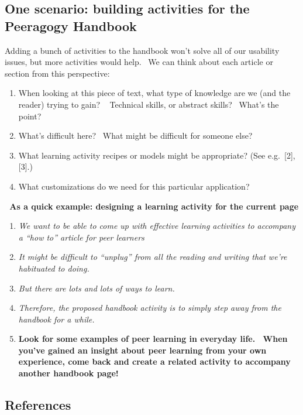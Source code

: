 \hypertarget{one-scenario-building-activities-for-the-peeragogy-handbook}{%
\subsection{One scenario: building activities for the Peeragogy
Handbook}\label{one-scenario-building-activities-for-the-peeragogy-handbook}}

Adding a bunch of activities to the handbook won't solve all of our
usability issues, but more activities would help.~ We can think about
each article or section from this perspective:

\begin{enumerate}
\def\labelenumi{\arabic{enumi}.}
\item
  When looking at this piece of text, what type of knowledge are we (and
  the reader) trying to gain? ~ Technical skills, or abstract skills?~
  What's the point?
\item
  What's difficult here? ~What might be difficult for someone else?
\item
  What learning activity recipes or models might be appropriate? (See
  e.g.~{{[}2{]}}, {{[}3{]}}.)
\item
  What customizations do we need for this particular application?
\end{enumerate}

\textbf{\emph{~}As a quick example: designing a learning activity for
the current page}

\begin{enumerate}
\def\labelenumi{\arabic{enumi}.}
\item
  \emph{We want to be able to come up with effective learning activities
  to accompany a ``how to'' article for peer learners}
\item
  \emph{It might be difficult to ``unplug'' from all the reading and
  writing that we're habituated to doing.}
\item
  \emph{But there are lots and lots of ways to learn.}
\item
  \emph{Therefore, the proposed handbook activity is to simply step away
  from the handbook for a while.}
\item
  \textbf{Look for some examples of peer learning in everyday life.~
  When you've gained an insight about peer learning from your own
  experience, come back and create a related activity to accompany
  another handbook page!}
\end{enumerate}

\hypertarget{references}{%
\subsection{References}\label{references}}

